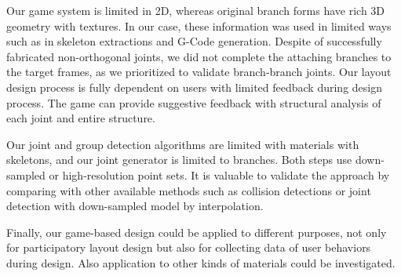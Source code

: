 Our game system is limited in 2D, whereas original branch forms have rich 3D geometry with textures.
In our case, these information was used in limited ways such as in skeleton extractions and G-Code generation.
Despite of successfully fabricated non-orthogonal joints, we did not complete the attaching branches to the target frames, as we prioritized to validate branch-branch joints.
Our layout design process is fully dependent on users with limited feedback during design process.
The game can provide suggestive feedback with structural analysis of each joint and entire structure.

Our joint and group detection algorithms are limited with materials with skeletons, and our joint generator is limited to branches.
Both steps use down-sampled or high-resolution point sets.
It is valuable to validate the approach by comparing with other available methods such as collision detections or joint detection with down-sampled model by interpolation.

Finally, our game-based design could be applied to different purposes, not only for participatory layout design but also for collecting data of user behaviors during design.
Also application to other kinds of materials could be investigated.
